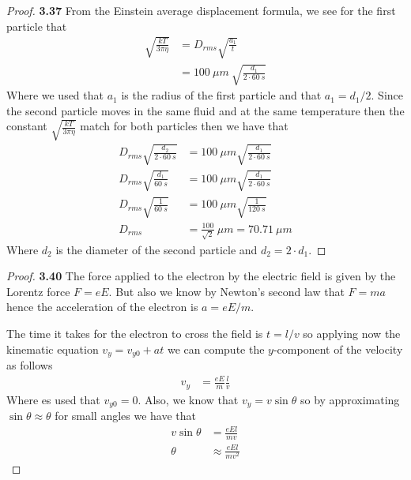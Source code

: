 \documentclass[11pt]{article}
\theoremstyle{definition}
\begin{document}
\cleardoublepage
\begin{proof}{\textbf{3.37}}
    From the Einstein average displacement formula, we see for the first
    particle that
    \begin{align*}
        \sqrt{\frac{kT}{3\pi\eta}} &= D_{rms}\sqrt{\frac{a_1}{t}}\\
            &= 100~\mu m~\sqrt{\frac{d_1}{2\cdot 60~s}}
    \end{align*}
    Where we used that $a_1$ is the radius of the first particle and that
    $a_1 = d_1/2$. Since the second particle moves in the same fluid and at the
    same temperature then the constant $\sqrt{\frac{kT}{3\pi\eta}}$ match
    for both particles then we have that
    \begin{align*}
        D_{rms} \sqrt{\frac{d_2}{2\cdot60~s}}
        &= 100~\mu m\sqrt{\frac{d_1}{2\cdot60~s}}\\
        D_{rms} \sqrt{\frac{d_1}{60~s}}
        &= 100~\mu m\sqrt{\frac{d_1}{2\cdot60~s}}\\
        D_{rms} \sqrt{\frac{1}{60~s}}
        &= 100~\mu m\sqrt{\frac{1}{120~s}}\\
        D_{rms} &= \frac{100}{\sqrt{2}}~\mu m = 70.71~\mu m
    \end{align*}
    Where $d_2$ is the diameter of the second particle and $d_2 = 2 \cdot d_1$.
\end{proof}
\cleardoublepage
\begin{proof}{\textbf{3.40}}
    The force applied to the electron by the electric field is given by
    the Lorentz force $F = e E$.
    But also we know by Newton's second law that $F = ma$ hence
    the acceleration of the electron is $a = eE/m$.

    The time it takes for the electron to cross the field is $t = l/v$ so
    applying now the kinematic equation
    $v_y = v_{y0} + at$ we can compute the $y$-component of the velocity as
    follows
    \begin{align*}
        v_y &= \frac{eE}{m}\frac{l}{v}
    \end{align*}
    Where es used that $v_{y0} = 0$. Also, we know that $v_y = v \sin\theta$ so
    by approximating $\sin\theta \approx \theta$ for small angles we have that
    \begin{align*}
        v\sin\theta &= \frac{eEl}{mv}\\
        \theta &\approx \frac{eEl}{mv^2}
    \end{align*}
\end{proof}
\cleardoublepage
\end{document}
